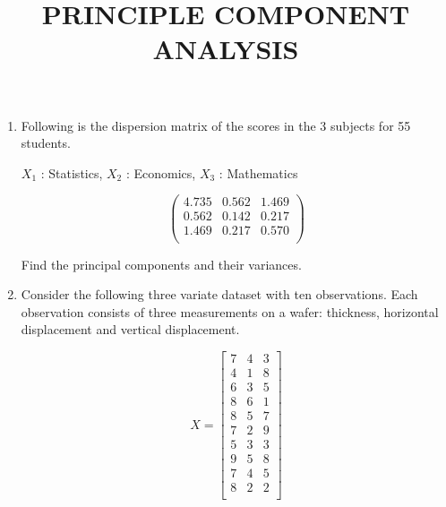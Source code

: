 \documentclass[11pt, a4paper]{article}
\title{\textbf{PRINCIPLE COMPONENT ANALYSIS}}
\author{}
\date{}
\begin{document}
\maketitle



\begin{enumerate}






	\item Following is the dispersion matrix of the scores in the 3 subjects for 55 students. 
	
	\begin{center}
	$X_1$ : Statistics, $X_2$ : Economics, $X_3$ : Mathematics
	\end{center}
	
	$$\begin{pmatrix}
	4.735 & 0.562 & 1.469 \\
	0.562 & 0.142 & 0.217 \\
	1.469 & 0.217 & 0.570 \\
	\end{pmatrix}$$


\vspace{0.5cm}

	Find the principal components and their variances.
	
	
	
	
	
	
	
	
	
	
	
	
	
\vspace{2cm}









	\item Consider the following three variate dataset with ten observations. Each observation consists of three measurements on a wafer: thickness, horizontal displacement and vertical displacement. 


\[
X = \begin{bmatrix}
7 & 4 & 3 \\
4 & 1 & 8 \\
6 & 3 & 5 \\
8 & 6 & 1 \\
8 & 5 & 7 \\
7 & 2 & 9 \\
5 & 3 & 3 \\
9 & 5 & 8 \\
7 & 4 & 5 \\
8 & 2 & 2 \\
\end{bmatrix}
\]	



\end{enumerate}
\end{document}
